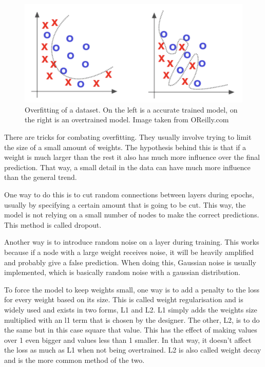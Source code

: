 \begin{figure}[hbtp]
\begin{center}
\includegraphics[width = 1.0\textwidth]{./Images/overfitting.jpg} 
\caption{Overfitting of a dataset. On the left is a accurate trained model, on the right is an overtrained model. Image taken from OReilly.com}
\end{center}
\end{figure}

\cite{overtraining}

There are tricks for combating overfitting. They usually involve trying to limit the size of a small amount of weights.
The hypothesis behind this is that if a weight is much larger than the rest it also has much more influence over the final prediction. That way, a small detail in the data can have much more influence than the general trend.

One way to do this is to cut random connections between layers during epochs, usually by specifying a certain amount that is going to be cut.
This way, the model is not relying on a small number of nodes to make the correct predictions. This method is called dropout.

Another way is to introduce random noise on a layer during training. This works because if a node with a large weight receives noise, it will be heavily amplified and probably give a false prediction.
When doing this, Gaussian noise is usually implemented, which is basically random noise with a gaussian distribution.

To force the model to keep weights small, one way is to add a penalty to the loss for every weight based on its size. 
This is called weight regularisation and is widely used and exists in two forms, L1 and L2.
L1 simply adds the weights size multiplied with an l1 term that is chosen by the designer.
The other, L2, is to do the same but in this case square that value. This has the effect of making values over 1 even bigger and values less than 1 smaller.
In that way, it doesn't affect the loss as much as L1 when not being overtrained. L2 is also called weight decay and is the more common method of the two.

